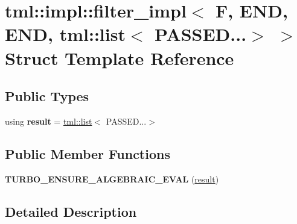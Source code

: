 \hypertarget{structtml_1_1impl_1_1filter__impl_3_01_f_00_01_e_n_d_00_01_e_n_d_00_01tml_1_1list_3_01_p_a_s_s_e_d_8_8_8_4_01_4}{\section{tml\+:\+:impl\+:\+:filter\+\_\+impl$<$ F, E\+N\+D, E\+N\+D, tml\+:\+:list$<$ P\+A\+S\+S\+E\+D...$>$ $>$ Struct Template Reference}
\label{structtml_1_1impl_1_1filter__impl_3_01_f_00_01_e_n_d_00_01_e_n_d_00_01tml_1_1list_3_01_p_a_s_s_e_d_8_8_8_4_01_4}
}
\subsection*{Public Types}
\begin{DoxyCompactItemize}
\item 
\hypertarget{structtml_1_1impl_1_1filter__impl_3_01_f_00_01_e_n_d_00_01_e_n_d_00_01tml_1_1list_3_01_p_a_s_s_e_d_8_8_8_4_01_4_aeabe8081dcc475577150f92cd4aefcc5}{using {\bfseries result} = \hyperlink{structtml_1_1list}{tml\+::list}$<$ P\+A\+S\+S\+E\+D...$>$}\label{structtml_1_1impl_1_1filter__impl_3_01_f_00_01_e_n_d_00_01_e_n_d_00_01tml_1_1list_3_01_p_a_s_s_e_d_8_8_8_4_01_4_aeabe8081dcc475577150f92cd4aefcc5}

\end{DoxyCompactItemize}
\subsection*{Public Member Functions}
\begin{DoxyCompactItemize}
\item 
\hypertarget{structtml_1_1impl_1_1filter__impl_3_01_f_00_01_e_n_d_00_01_e_n_d_00_01tml_1_1list_3_01_p_a_s_s_e_d_8_8_8_4_01_4_a341486098f513bd848e0dd0c2322e873}{{\bfseries T\+U\+R\+B\+O\+\_\+\+E\+N\+S\+U\+R\+E\+\_\+\+A\+L\+G\+E\+B\+R\+A\+I\+C\+\_\+\+E\+V\+A\+L} (\hyperlink{structtml_1_1list}{result})}\label{structtml_1_1impl_1_1filter__impl_3_01_f_00_01_e_n_d_00_01_e_n_d_00_01tml_1_1list_3_01_p_a_s_s_e_d_8_8_8_4_01_4_a341486098f513bd848e0dd0c2322e873}

\end{DoxyCompactItemize}


\subsection{Detailed Description}
